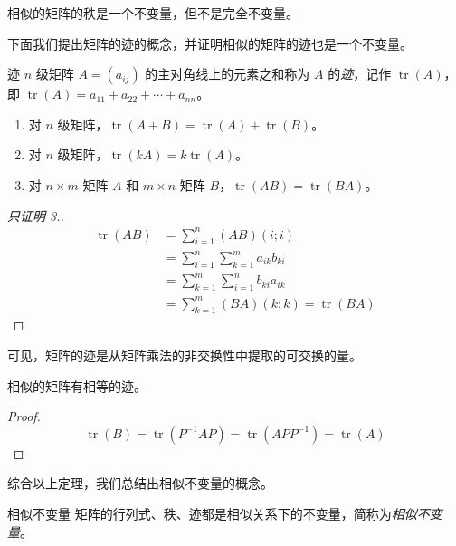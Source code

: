 \begin{theorem}
	相似的矩阵的秩是一个不变量，但不是完全不变量。
\end{theorem}

下面我们提出矩阵的迹的概念，并证明相似的矩阵的迹也是一个不变量。

\begin{definition}{迹}
	$n$ 级矩阵 $A = (a_{ij})$ 的主对角线上的元素之和称为 $A$ 的\emph{迹}，记作 $\operatorname{tr}(A)$， 即 $\operatorname{tr}(A) = a_{11} + a_{22} + \cdots + a_{nn}$。
\end{definition}

\begin{theorem}[矩阵的迹的运算性质]
	\begin{enumerate}
		\item 对 $n$ 级矩阵，$\operatorname{tr}(A + B) = \operatorname{tr}(A) + \operatorname{tr}(B)$。
		\item 对 $n$ 级矩阵，$\operatorname{tr}(kA) = k \operatorname{tr}(A)$。
		\item 对 $n \times m$ 矩阵 $A$ 和 $m \times n$ 矩阵 $B$，$\operatorname{tr}(AB) = \operatorname{tr}(BA)$。
	\end{enumerate}
\end{theorem}

\begin{proof}[只证明 3.]
	$$
	\begin{aligned}
		\operatorname{tr}(AB) &= \sum_{i = 1}^n (AB)(i; i)
		\\&=
		\sum_{i = 1}^n \sum_{k = 1}^m a_{ik} b_{ki}
		\\&=
		\sum_{k = 1}^m \sum_{i = 1}^n b_{ki} a_{ik}
		\\&=
		\sum_{k = 1}^m (BA)(k;k) = \operatorname{tr}(BA)
	\end{aligned}
	$$
\end{proof}

可见，矩阵的迹是从矩阵乘法的非交换性中提取的可交换的量。

\begin{theorem}
	相似的矩阵有相等的迹。
\end{theorem}

\begin{proof}
	$$
	\operatorname{tr}(B) = \operatorname{tr}(P^{-1} A P) = \operatorname{tr}(APP^{-1}) = \operatorname{tr}(A)
	$$
\end{proof}

综合以上定理，我们总结出相似不变量的概念。

\begin{definition}{相似不变量}
	矩阵的行列式、秩、迹都是相似关系下的不变量，简称为\emph{相似不变量}。
\end{definition}

